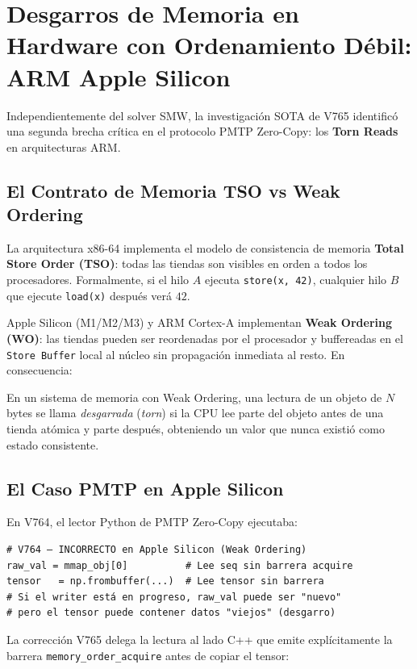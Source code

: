 \section{Desgarros de Memoria en Hardware con Ordenamiento Débil: ARM Apple Silicon}

Independientemente del solver SMW, la investigación SOTA de V765 identificó una segunda
brecha crítica en el protocolo PMTP Zero-Copy: los \textbf{Torn Reads} en arquitecturas ARM.

\subsection{El Contrato de Memoria TSO vs Weak Ordering}

La arquitectura x86-64 implementa el modelo de consistencia de memoria
\textbf{Total Store Order (TSO)}: todas las tiendas son visibles en orden a todos los procesadores.
Formalmente, si el hilo $A$ ejecuta \texttt{store(x, 42)}, cualquier hilo $B$ que
ejecute \texttt{load(x)} después verá $42$.

Apple Silicon (M1/M2/M3) y ARM Cortex-A implementan \textbf{Weak Ordering (WO)}:
las tiendas pueden ser reordenadas por el procesador y buffereadas en el \texttt{Store Buffer}
local al núcleo sin propagación inmediata al resto. En consecuencia:

\begin{definition}
En un sistema de memoria con Weak Ordering, una lectura de un objeto de $N$ bytes se
llama \emph{desgarrada} (\textit{torn}) si la CPU lee parte del objeto antes de una tienda
atómica y parte después, obteniendo un valor que nunca existió como estado consistente.
\end{definition}

\subsection{El Caso PMTP en Apple Silicon}

En V764, el lector Python de PMTP Zero-Copy ejecutaba:
\begin{verbatim}
# V764 — INCORRECTO en Apple Silicon (Weak Ordering)
raw_val = mmap_obj[0]          # Lee seq sin barrera acquire
tensor   = np.frombuffer(...)  # Lee tensor sin barrera
# Si el writer está en progreso, raw_val puede ser "nuevo"
# pero el tensor puede contener datos "viejos" (desgarro)
\end{verbatim}

La corrección V765 delega la lectura al lado C++ que emite explícitamente la barrera
\texttt{memory\_order\_acquire} antes de copiar el tensor:


